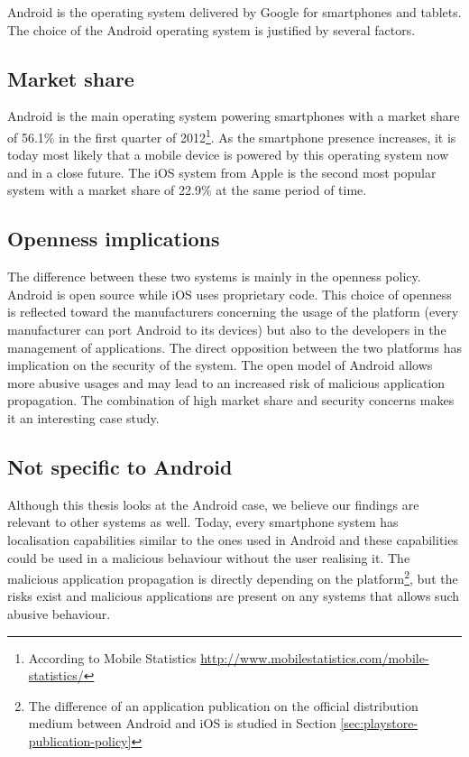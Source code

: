 Android is the operating system delivered by Google for smartphones and tablets.
The choice of the Android operating system is justified by several factors.\\

\subsection*{Market share}

Android is the main operating system powering smartphones with a market share of 56.1\% in the first quarter of 2012\footnote{According to Mobile Statistics \url{http://www.mobilestatistics.com/mobile-statistics/}}.
As the smartphone presence increases, it is today most likely that a mobile device is powered by this operating system now and in a close future.
The iOS system from Apple is the second most popular system with a market share of 22.9\% at the same period of time.\\

\subsection*{Openness implications}
The difference between these two systems is mainly in the openness policy.
Android is open source while iOS uses proprietary code.
This choice of openness is reflected toward the manufacturers concerning the usage of the platform (every manufacturer can port Android to its devices) but also to the developers in the management of applications.
The direct opposition between the two platforms has implication on the security of the system.
The open model of Android allows more abusive usages and may lead to an increased risk of malicious application propagation.
The combination of high market share and security concerns makes it an interesting case study.\\

\subsection*{Not specific to Android}
Although this thesis looks at the Android case, we believe our findings are relevant to other systems as well.
Today, every smartphone system has localisation capabilities similar to the ones used in Android and these capabilities could be used in a malicious behaviour without the user realising it.
The malicious application propagation is directly depending on the platform\footnote{The difference of an application publication on the official distribution medium between Android and iOS is studied in Section \ref{sec:playstore-publication-policy}}, but the risks exist and malicious applications are present on any systems that allows such abusive behaviour.

